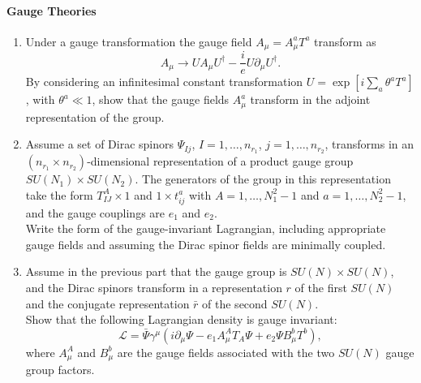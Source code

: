 \documentclass[letterpaper,11pt]{article}
\begin{document}
\paragraph*{Gauge Theories}
\begin{enumerate}
  \item Under a gauge transformation the gauge field $A_\mu = A^a_\mu T^a$ transform as
  \begin{equation*}
    A_\mu \to U A_\mu U^\dagger - \frac{i}{e} U \partial_\mu U^\dagger.
  \end{equation*}
  By considering an infinitesimal constant transformation $U = \exp \left[ i \sum_a \theta^a T^a \right]$, with $\theta^a \ll 1$, show that the gauge fields $A^a_\mu$ transform in the adjoint representation of the group.
  \item Assume a set of Dirac spinors $\Psi_{Ij}$, $I = 1,\ldots,n_{r_1}$, $j = 1,\ldots,n_{r_2}$, transforms in an $(n_{r_1} \times n_{r_2})$-dimensional representation of a product gauge group $SU(N_1) \times SU(N_2)$. The generators of the group in this representation take the form $T^A_{IJ} \times 1$ and $1 \times t^a_{ij}$ with $A = 1,\ldots,N_1^2 - 1$ and $a = 1,\ldots,N_2^2 - 1$, and the gauge couplings are $e_1$ and $e_2$.
  \\
  Write the form of the gauge-invariant Lagrangian, including appropriate gauge fields and assuming the Dirac spinor fields  are minimally coupled.
  \item Assume in the previous part that the gauge group is $SU(N) \times SU(N)$, and the Dirac spinors transform in a representation $r$ of the first $SU(N)$ and the conjugate representation $\bar{r}$ of the second $SU(N)$.
  \\
  Show that the following Lagrangian density is gauge invariant:
  \begin{equation*}
    \mathcal{L} = \bar{\Psi} \gamma^\mu (i\partial_\mu \Psi - e_1 A^A_\mu T_A \Psi + e_2 \Psi B^b_\mu T^b),
  \end{equation*}
  where $A^A_\mu$ and $B^b_\mu$ are the gauge fields associated with the two $SU(N)$ gauge group factors.
\end{enumerate}
\end{document}
